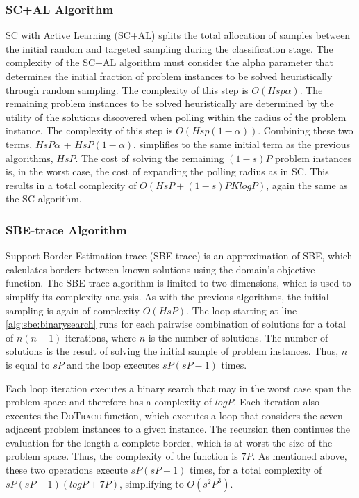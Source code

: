 \subsubsection{SC+AL Algorithm} SC with Active Learning (SC+AL) splits the total allocation of samples between the initial random and targeted sampling during the classification stage. The complexity of the SC+AL algorithm must consider the alpha parameter that determines the initial fraction of problem instances  to be solved heuristically through random sampling.  The complexity of this step is $O(Hsp\alpha)$.  The remaining problem instances to be solved heuristically are determined by the  utility of the solutions discovered when polling within the radius of the problem instance.  The complexity of this step is $O(Hsp(1-\alpha))$.  Combining these two terms,  $HsP\alpha$ + $HsP(1-\alpha)$, simplifies to the same initial term as the previous algorithms, $HsP$.  The cost of solving the remaining $(1-s)P$ problem instances is, in the worst case, the cost of expanding the polling radius as in SC.  This results in a total complexity of $O(HsP + (1-s)PKlogP)$, again the same as the SC algorithm.

\subsubsection{SBE-trace Algorithm} Support Border Estimation-trace (SBE-trace) is an approximation of SBE, which calculates borders between known solutions using the domain's objective function. The SBE-trace algorithm is limited to two dimensions, which is used to simplify its complexity analysis.  As with the previous algorithms, the initial sampling  is again of complexity $O(HsP)$.  The loop starting at line \ref{alg:sbe:binarysearch} runs for each pairwise combination of solutions for a total of $n(n-1)$ iterations, where $n$ is the number of solutions.  The number of solutions is the result of solving the initial sample of problem instances. Thus, $n$ is equal to $sP$ and the loop executes $sP(sP-1)$ times.

Each loop iteration executes a binary search that may in the worst case span the problem space and therefore has a complexity of $logP$.  Each iteration also executes the \textsc{DoTrace} function, which executes a loop that considers the seven adjacent problem instances to a given instance.  The recursion then continues the evaluation for the length a complete border, which is at worst the size of the problem space.  Thus, the complexity of the function is $7P$.  As mentioned above, these two operations execute $sP(sP-1)$ times, for a total complexity of $sP(sP-1)(logP + 7P)$, simplifying to $O(s^2P^3)$.

